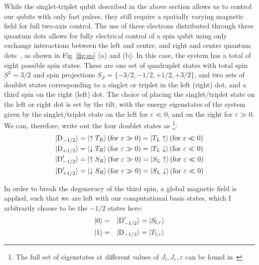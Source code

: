While the singlet-triplet qubit described in the above section allows us to control our qubits with only fast pulses, they still require
a spatially varying magnetic field for full two-axis control. The use of three electrons distributed through three quantum dots allows
for fully electrical control of a spin qubit using only exchange interactions between the left and centre, and right and centre quantum
dots~\cite{10.1038-35042541}, as shown in Fig~\ref{fig:eo} (a) and (b). In this case, the system has a total of eight possible spin states. These
are one set of quadruplet states with total spin $S^2 = 3/2$ and spin projections $S_Z = \{-3/2, -1/2, +1/2, +3/2\}$, and two sets of doublet
states corresponding to a singlet or triplet in the left (right) dot, and a third spin on the right (left) dot. The choice of placing the singlet/triplet
state on the left or right dot is set by the tilt, with the energy eigenstates of the system given by the singlet/triplet state on the left for $\varepsilon \ll 0$,
and on the right for $\varepsilon \gg 0$. We can, therefore, write out the four doublet states as
\footnote{The full set of eigenstates at different values of $J_l, J_r, \varepsilon$ can be found in~\cite{PhysRevB.82.075403}}:
\begin{equation}
\begin{split}
  \ket{\textrm{D}_{-1/2}}        &= \ket{\uparrow T_R}   (\textrm{for }\varepsilon \gg 0) = \ket{T_L\uparrow}   (\textrm{for }\varepsilon \ll 0)\\
  \ket{\textrm{D}_{+1/2}}        &= \ket{\downarrow T_R} (\textrm{for }\varepsilon \gg 0) = \ket{T_L\downarrow} (\textrm{for }\varepsilon \ll 0)\\
  \ket{\textrm{D}^\prime_{-1/2}} &= \ket{\uparrow S_R}   (\textrm{for }\varepsilon \gg 0) = \ket{S_L\uparrow}   (\textrm{for }\varepsilon \ll 0)\\
  \ket{\textrm{D}^\prime_{+1/2}} &= \ket{\downarrow S_R} (\textrm{for }\varepsilon \gg 0) = \ket{S_L\downarrow} (\textrm{for }\varepsilon \ll 0)\\
\end{split}
\end{equation}

In order to break the degeneracy of the third spin, a global magnetic field is applied, such that we are left with our computational basis states, which
I arbitrarily choose to be the $-1/2$ states here:
\begin{alignat}{2}
  \ket{0} &=& \ket{\textrm{D}^\prime_{-1/2}} &= \ket{S_{l,r}} \\
  \ket{1} &=& \ket{\textrm{D}_{-1/2}} &= \ket{T_{l,r}}
\end{alignat}

